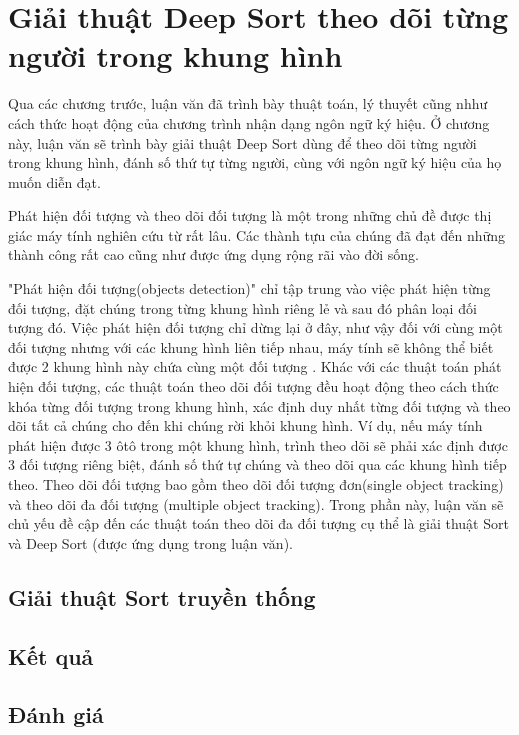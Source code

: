 \chapter{Giải thuật Deep Sort theo dõi từng người trong khung hình}
Qua các chương trước, luận văn đã trình bày thuật toán, lý thuyết cũng nhhư cách thức hoạt động của chương trình nhận dạng ngôn ngữ ký hiệu. Ở chương này, luận văn sẽ trình bày giải thuật Deep Sort dùng để theo dõi từng người trong khung hình, đánh số thứ tự từng người, cùng với ngôn ngữ ký hiệu của họ muốn diễn đạt.

Phát hiện đối tượng và theo dõi đối tượng là một trong những chủ đề được thị giác máy tính nghiên cứu từ rất lâu. Các thành tựu của chúng đã đạt đến những thành công rất cao cũng như được ứng dụng rộng rãi vào đời sống.

"Phát hiện đối tượng(objects detection)" chỉ tập trung vào việc phát hiện từng đối tượng, đặt chúng trong từng khung hình riêng lẻ và sau đó phân loại đối tượng đó. Việc phát hiện đối tượng chỉ dừng lại ở đây, như vậy đối với cùng một đối tượng nhưng với các khung hình liên tiếp nhau, máy tính sẽ không thể biết được 2 khung hình này chứa cùng một đối tượng . Khác với các thuật toán phát hiện đối tượng, các thuật toán theo dõi đối tượng đều hoạt động theo cách thức khóa từng đối tượng trong khung hình, xác định duy nhất từng đối tượng và theo dõi tất cả chúng cho đến khi chúng rời khỏi khung hình. Ví dụ, nếu máy tính phát hiện được 3 ôtô trong một khung hình, trình theo dõi sẽ phải xác định được 3 đối tượng riêng biệt, đánh số thứ tự chúng và theo dõi qua các khung hình tiếp theo. Theo dõi đối tượng bao gồm theo dõi đối tượng đơn(single object tracking) và theo dõi đa đối tượng (multiple object tracking). Trong phần này, luận văn sẽ chủ yếu đề cập đến các thuật toán theo dõi đa đối tượng cụ thể là giải thuật Sort và Deep Sort (được ứng dụng trong luận văn).  
 
\section{Giải thuật Sort truyền thống}



\section{Kết quả}


\section{Đánh giá}
